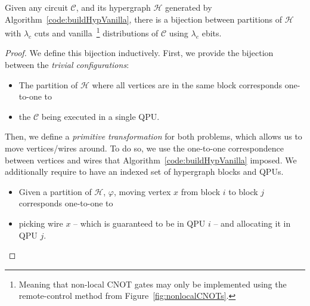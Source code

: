 \begin{theorem} Given any circuit \(\mathcal{C}\), and its hypergraph \(\mathcal{H}\) generated by Algorithm~\ref{code:buildHypVanilla}, there is a bijection between partitions of \(\mathcal{H}\) with \(\lambda_c\) cuts and vanilla~\footnote{Meaning that non-local CNOT gates may only be implemented using the remote-control method from Figure~\ref{fig:nonlocalCNOTs}.} distributions of \(\mathcal{C}\) using \(\lambda_e\) ebits.
\label{thm:vanilla}
\end{theorem} \begin{proof}
We define this bijection inductively. First, we provide the bijection between the \textit{trivial configurations}:
\begin{itemize}
  \item The partition of \(\mathcal{H}\) where all vertices are in the same block corresponds one-to-one to 
  \item the \(\mathcal{C}\) being executed in a single QPU.
\end{itemize}

Then, we define a \textit{primitive transformation} for both problems, which allows us to move vertices/wires around. To do so, we use the one-to-one correspondence between vertices and wires that Algorithm~\ref{code:buildHypVanilla} imposed. We additionally require to have an indexed set of hypergraph blocks and QPUs.
\begin{itemize}
  \item Given a partition of \(\mathcal{H}\), \(\varphi\), moving vertex \(x\) from block \(i\) to block \(j\) corresponds one-to-one to
  \item picking wire \(x\) -- which is guaranteed to be in QPU \(i\) -- and allocating it in QPU \(j\).
\end{itemize}


\end{proof}
